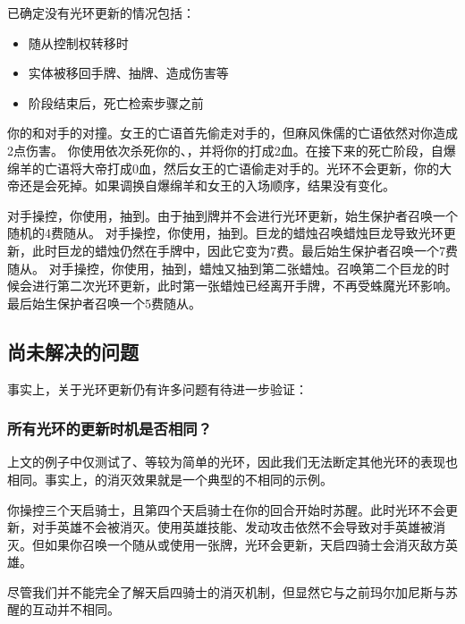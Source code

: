 已确定没有光环更新的情况包括：
\begin{itemize}
    \item 随从控制权转移时
    \item 实体被移回手牌、抽牌、造成伤害等
    \item 阶段结束后，死亡检索步骤之前
\end{itemize}

\example 你的和对手的对撞。女王的亡语首先偷走对手的，但麻风侏儒的亡语依然对你造成2点伤害。
\example 你使用依次杀死你的、，并将你的打成2血。在接下来的死亡阶段，自爆绵羊的亡语将大帝打成0血，然后女王的亡语偷走对手的。光环不会更新，你的大帝还是会死掉。如果调换自爆绵羊和女王的入场顺序，结果没有变化。

\vspace{\parskip}
\example 对手操控，你使用，抽到。由于抽到牌并不会进行光环更新，始生保护者召唤一个随机的4费随从。
\example 对手操控，你使用，抽到。巨龙的蜡烛召唤蜡烛巨龙导致光环更新，此时巨龙的蜡烛仍然在手牌中，因此它变为7费。最后始生保护者召唤一个7费随从。
\example 对手操控，你使用，抽到，蜡烛又抽到第二张蜡烛。召唤第二个巨龙的时候会进行第二次光环更新，此时第一张蜡烛已经离开手牌，不再受蛛魔光环影响。最后始生保护者召唤一个5费随从。

\subsection{尚未解决的问题}
事实上，关于光环更新仍有许多问题有待进一步验证：

\subsubsection{所有光环的更新时机是否相同？}
上文的例子中仅测试了、等较为简单的光环，因此我们无法断定其他光环的表现也相同。事实上，的消灭效果就是一个典型的不相同的示例。

\example 你操控三个天启骑士，且第四个天启骑士在你的回合开始时苏醒。此时光环不会更新，对手英雄不会被消灭。使用英雄技能、发动攻击依然不会导致对手英雄被消灭。但如果你召唤一个随从或使用一张牌，光环会更新，天启四骑士会消灭敌方英雄。

尽管我们并不能完全了解天启四骑士的消灭机制，但显然它与之前玛尔加尼斯与苏醒的互动并不相同。

